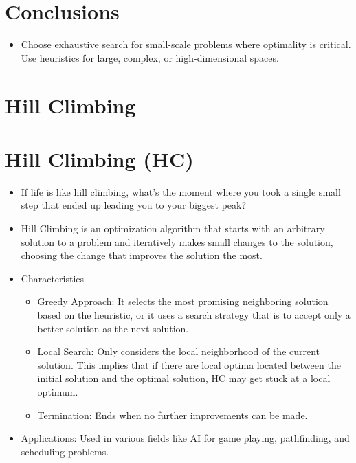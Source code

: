 \documentclass[
  letterpaper,
  DIV=11,
  numbers=noendperiod]{scrreprt}
\providecommand{\tightlist}{%
  \setlength{\itemsep}{0pt}\setlength{\parskip}{0pt}}\usepackage{longtable,booktabs,array}
\begin{document}

\chapter{Conclusions}\label{conclusions-3}

\begin{itemize}
\tightlist
\item
  Choose exhaustive search for small-scale problems where optimality is
  critical. Use heuristics for large, complex, or high-dimensional
  spaces.
\end{itemize}


\chapter{Hill Climbing}\label{hill-climbing}


\chapter{Hill Climbing (HC)}\label{hill-climbing-hc}

\begin{itemize}
\item
  If life is like hill climbing, what's the moment where you took a
  single small step that ended up leading you to your biggest peak?
\item
  Hill Climbing is an optimization algorithm that starts with an
  arbitrary solution to a problem and iteratively makes small changes to
  the solution, choosing the change that improves the solution the most.
\item
  Characteristics

  \begin{itemize}
  \tightlist
  \item
    Greedy Approach: It selects the most promising neighboring solution
    based on the heuristic, or it uses a search strategy that is to
    accept only a better solution as the next solution.
  \item
    Local Search: Only considers the local neighborhood of the current
    solution. This implies that if there are local optima located
    between the initial solution and the optimal solution, HC may get
    stuck at a local optimum.
  \item
    Termination: Ends when no further improvements can be made.
  \end{itemize}
\item
  Applications: Used in various fields like AI for game playing,
  pathfinding, and scheduling problems.
\end{itemize}
\end{document}

